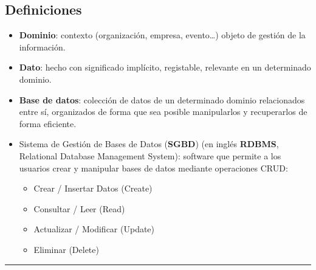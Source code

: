 \documentclass[]{book}
\providecommand{\tightlist}{%
  \setlength{\itemsep}{0pt}\setlength{\parskip}{0pt}}
\begin{document}
\hypertarget{definiciones}{%
\subsection{Definiciones}\label{definiciones}}

\begin{itemize}
\item
  \textbf{Dominio}: contexto (organización, empresa, evento\ldots{}) objeto de gestión de la información.
\item
  \textbf{Dato}: hecho con significado implícito, registable, relevante en un determinado dominio.
\item
  \textbf{Base de datos}: colección de datos de un determinado dominio relacionados entre sí, organizados de forma que sea posible manipularlos y recuperarlos de forma eficiente.
\item
  Sistema de Gestión de Bases de Datos (\textbf{SGBD}) (en inglés \textbf{RDBMS}, Relational Database Management System): software que permite a los usuarios crear y manipular bases de datos mediante operaciones CRUD:

  \begin{itemize}
  \tightlist
  \item
    Crear / Insertar Datos (Create)
  \item
    Consultar / Leer (Read)
  \item
    Actualizar / Modificar (Update)
  \item
    Eliminar (Delete)
  \end{itemize}
\end{itemize}

\begin{center}\rule{0.5\linewidth}{\linethickness}\end{center}
\end{document}

